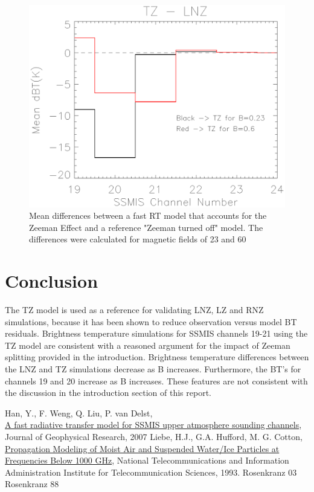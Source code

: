 \begin{figure}[htp]
  \centering{}
  \includegraphics[scale=0.8]{./graphics/TZ_Versus_LNZ.eps}
  \caption{Mean differences between a fast RT model that accounts for the Zeeman Effect and a reference "Zeeman turned off"
   model. The differences were calculated for magnetic fields of 23\microtesla{} and 60\microtesla{}}
  \label{fig:TZ_Versus_LNZ}
\end{figure}


\newpage
\section{Conclusion}

The TZ model is used as a reference for validating LNZ, LZ and RNZ simulations, because it has been shown
to reduce observation versus model BT residuals. 
Brightness temperature simulations for SSMIS channels 19-21 using the TZ model are consistent with a reasoned argument for 
the impact of Zeeman splitting provided in the introduction.
Brightness temperature differences between the LNZ and TZ simulations decrease as B increases. Furthermore,
the BT's for channels 19 and 20 increase as B increases. These features
are not consistent with the discussion in the introduction section of this report.



\newpage

\begin{thebibliography}{99}
   Han, Y., F. Weng, Q. Liu, P. van Delst,\\ \underline{A fast radiative transfer model for SSMIS upper atmosphere sounding channels}, Journal of Geophysical Research, 2007
   Liebe, H.J., G.A. Hufford, M. G. Cotton,\\ \underline{Propagation Modeling of Moist Air and Suspended Water/Ice Particles at Frequencies Below 1000 GHz}, National Telecommunications
  and Information Administration Institute for Telecommunication Sciences, 1993.
   Rosenkranz 03
   Rosenkranz 88
\end{thebibliography}



\begin{appendix}
\end{appendix}



